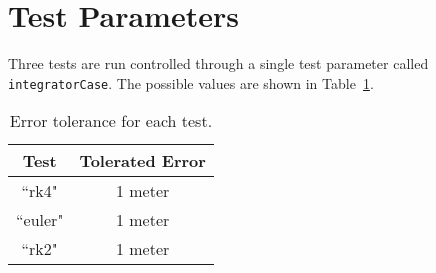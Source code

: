 \section{Test Parameters}
Three tests are run controlled through a single test parameter called {\tt integratorCase}.  The possible values are shown in Table~\ref{tbl:intCases}.  

\begin{table}[htbp]
	\caption{Error tolerance for each test.}
	\label{tbl:intCases}
	\centering \fontsize{10}{10}\selectfont
	\begin{tabular}{ c | c } %
		\hline\hline
		\textbf{Test}   	      	               & \textbf{Tolerated Error} 						           \\ \hline
		``rk4"                           & 1 meter	  \\ 
		``euler"                           & 1 meter	  \\ 
		``rk2"                           & 1 meter	  \\ 
		\hline\hline
	\end{tabular}
\end{table}

